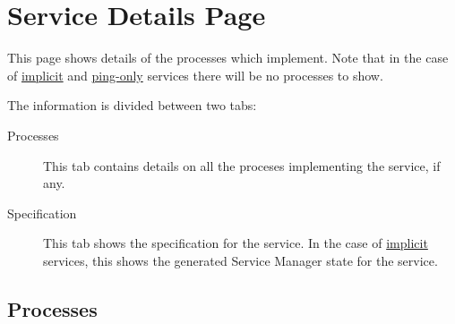 \section{Service Details Page}
\label{sec:ws-service-details}

This page shows details of the processes which implement.  Note that in the case of
\hyperref[sec:services.implicit]{implicit} and \hyperref[subsub:services.ping-only]{ping-only}
services there will be no processes to show.

The information is divided between two tabs:

   \begin{description}
       \item[Processes] This tab contains details on all the proceses implementing
         the service, if any.
       \item[Specification] This tab shows the specification for the service.  In the
         case of \hyperref[sec:services.implicit]{implicit} services, this shows the generated Service Manager
         state for the service.
   \end{description}  

   \subsection{Processes}
   \label{sec:ws-services-processes}

